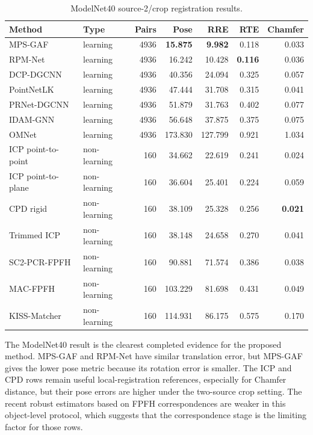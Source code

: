 \begin{table}[H]
  \centering
  \caption{ModelNet40 source-2/crop registration results.}
  \label{tab:appendix-modelnet40-registration}
  \scriptsize
  \begin{tabular}{llrrrrr}
    \toprule
    Method & Type & Pairs & Pose & RRE & RTE & Chamfer \\
    \midrule
    MPS-GAF & learning & 4936 & \textbf{15.875} & \textbf{9.982} & 0.118 & 0.033 \\
    RPM-Net & learning & 4936 & 16.242 & 10.428 & \textbf{0.116} & 0.036 \\
    DCP-DGCNN & learning & 4936 & 40.356 & 24.094 & 0.325 & 0.057 \\
    PointNetLK & learning & 4936 & 47.444 & 31.708 & 0.315 & 0.041 \\
    PRNet-DGCNN & learning & 4936 & 51.879 & 31.763 & 0.402 & 0.077 \\
    IDAM-GNN & learning & 4936 & 56.648 & 37.875 & 0.375 & 0.075 \\
    OMNet & learning & 4936 & 173.830 & 127.799 & 0.921 & 1.034 \\
    ICP point-to-point & non-learning & 160 & 34.662 & 22.619 & 0.241 & 0.024 \\
    ICP point-to-plane & non-learning & 160 & 36.604 & 25.401 & 0.224 & 0.059 \\
    CPD rigid & non-learning & 160 & 38.109 & 25.328 & 0.256 & \textbf{0.021} \\
    Trimmed ICP & non-learning & 160 & 38.148 & 24.658 & 0.270 & 0.041 \\
    SC2-PCR-FPFH & non-learning & 160 & 90.881 & 71.574 & 0.386 & 0.038 \\
    MAC-FPFH & non-learning & 160 & 103.229 & 81.698 & 0.431 & 0.049 \\
    KISS-Matcher & non-learning & 160 & 114.931 & 86.175 & 0.575 & 0.170 \\
    \bottomrule
  \end{tabular}
\end{table}

The ModelNet40 result is the clearest completed evidence for the proposed method. MPS-GAF and RPM-Net have similar translation error, but MPS-GAF gives the lower pose metric because its rotation error is smaller. The ICP and CPD rows remain useful local-registration references, especially for Chamfer distance, but their pose errors are higher under the two-source crop setting. The recent robust estimators based on FPFH correspondences are weaker in this object-level protocol, which suggests that the correspondence stage is the limiting factor for those rows.

